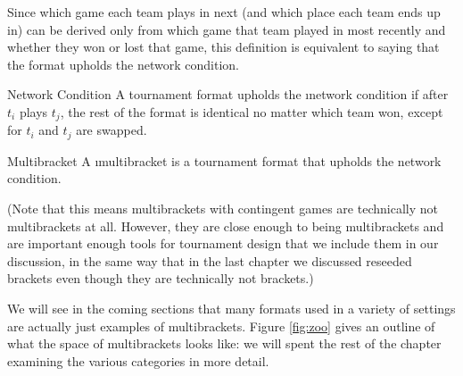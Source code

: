 {    Since which game each team plays in next (and which place each team ends up in) can be derived only from which game that team played in most recently and whether they won or lost that game, this definition is equivalent to saying that the format upholds the network condition.

    \begin{definition}{Network Condition}{}
        A tournament format upholds the \i{network condition} if after $t_i$ plays $t_j$, the rest of the format is identical no matter which team won, except for $t_i$ and $t_j$ are swapped.
    \end{definition}

    \begin{definition}{Multibracket}{}
        A \i{multibracket} is a tournament format that upholds the network condition.
    \end{definition}

    (Note that this means multibrackets with contingent games are technically not multibrackets at all. However, they are close enough to being multibrackets and are important enough tools for tournament design that we include them in our discussion, in the same way that  in the last chapter we discussed reseeded brackets even though they are technically not brackets.)

    We will see in the coming sections that many formats used in a variety of settings are actually just examples of multibrackets. Figure \ref{fig:zoo} gives an outline of what the space of multibrackets looks like: we will spent the rest of the chapter examining the various categories in more detail.

}